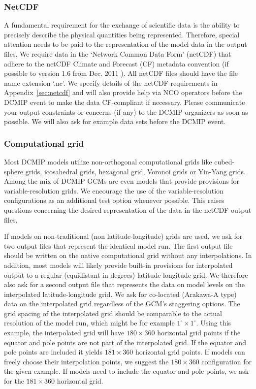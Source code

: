 \documentclass[times,doublespace]{fldauth}
\begin{document}
\subsubsection{NetCDF}
A fundamental requirement for the exchange of scientific data is the ability to  precisely describe the physical quantities being represented. Therefore, special attention needs to be paid to the representation of the model data in the output files. We require data in the `Network Common Data Form' (netCDF) \cite{netcdf} that adhere to the netCDF Climate and Forecast (CF) metadata convention (if possible to version 1.6 from Dec. 2011 \cite{netcdf-cf}). All netCDF files should have the file name extension `.nc'.
We specify details of the netCDF requirements in Appendix~\ref{sec:netcdf} and will also provide help via NCO operators before the DCMIP event to make the data CF-compliant if necessary. Please communicate your output constraints or concerns (if any) to the DCMIP organizers as soon as possible. We will also ask for example data sets before the DCMIP event.

\subsubsection{Computational grid}
Most DCMIP models utilize non-orthogonal computational grids like cubed-sphere grids, icosahedral grids, hexagonal grid, Voronoi grids or Yin-Yang grids. Among the mix of DCMIP GCMs are even models that provide provisions for variable-resolution grids. We encourage the use of the variable-resolution configurations as an additional test option whenever possible.
This raises questions concerning the desired representation of the data in the netCDF output files. 

If models on non-traditional (non latitude-longitude) grids are used, we ask for two output files that represent the identical model run. The first output file should be written on the native computational grid without any interpolations. In addition, most models will likely provide built-in provisions for interpolated output to a regular (equidistant in degrees) latitude-longitude grid. We therefore also ask for a second output file that represents the data on model levels on the interpolated latitude-longitude grid. We ask for co-located  (Arakawa-A type) data on the interpolated grid regardless of the GCM's staggering options. The grid spacing of the interpolated grid should be comparable to the actual resolution of the model run, which might be for example $1^\circ \times 1^\circ$. Using this example, the interpolated grid will have $180 \times 360$ horizontal grid points if the equator and pole points are not part of the interpolated grid. If the equator and pole points are included it yields $181 \times 360$ horizontal grid points. If models can freely choose their interpolation points, we suggest the $180 \times 360$ configuration for the given example. If models need to include the equator and pole points, we ask for the $181 \times 360$ horizontal grid. 
\end{document}
